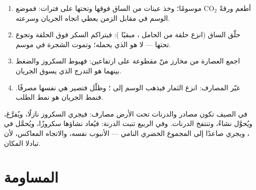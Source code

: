 \begin{method}\label{met:b1:plant-transport:translocation}
\begin{enumerate}
  \item أطعم ورقةً $\mathrm{CO_2}$ موسومًا؛ وخذ عينات من الساق فوقها
        وتحتها على فترات: فموضع الوسم في مقابل الزمن يعطي اتجاه
        الجريان وسرعته.
  \item حلّق الساق (انزع حلقة من  الحامل ، مبقيًا
        ): فيتراكم السكر فوق الحلقة وتجوع  تحتها ---
         لا  هو الذي يحمله؛ وتموت الشجرة في موسم.
  \item اجمع العصارة من مخارز منّ مقطوعة على ارتفاعين: فهبوط
        السكروز والضغط بينهما هو التدرج الذي يسوق الجريان.
  \item غيّر المصارف: انزع الثمار فيذهب الوسم إلى ؛ وظلّل
         فتصير هي نفسها مصرفًا. فنمط الجريان هو نمط الطلب.
\end{enumerate}
\end{method}

\begin{example}\label{ex:b1:plant-transport:potato}
في الصيف تكون  مصادر والدرنات تحت الأرض مصارف: فيجري
السكروز نازلًا، ويُفرَّغ، ويُحوَّل نشاءً، وتنتفخ الدرنات. وفي
الربيع تنبت الدرنة: فيُعاد نشاؤها سكروزًا، ويُحمَّل في ،
ويجري صاعدًا إلى المجموع الخضري النامي --- الأنبوب نفسه، والاتجاه
المعاكس، لأن   تبادلا المكان.
\end{example}

\section{المساومة}

